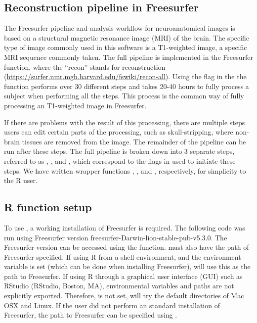 \subsection{Reconstruction pipeline in
Freesurfer}\label{reconstruction-pipeline-in-freesurfer}

The Freesurfer pipeline and analysis workflow for neuroanatomical images
is based on a structural magnetic resonance image (MRI) of the brain.
The specific type of image commonly used in this software is a
T1-weighted image, a specific MRI sequence commonly taken. The full
pipeline is implemented in the Freesurfer  function,
where the ``recon'' stands for reconstruction
(\url{https://surfer.nmr.mgh.harvard.edu/fswiki/recon-all}). Using the
 flag in the the  function performs over 30
different steps and takes 20-40 hours to fully process a subject when
performing all the steps. This process is the common way of fully
processing an T1-weighted image in Freesurfer.

If there are problems with the result of this processing, there are
multiple steps users can edit certain parts of the processing, such as
skull-stripping, where non-brain tissues are removed from the image. The
remainder of the pipeline can be run after these steps. The full
pipeline is broken down into 3 separate steps, referred to as
, , and , which
correspond to the flags in  used to initiate these
steps. We have written wrapper functions ,
, and , respectively, for simplicity
to the R user.

\subsection{R function setup}\label{r-function-setup}

To use , a working installation of Freesurfer is
required. The following code was run using Freesurfer version
freesurfer-Darwin-lion-stable-pub-v5.3.0. The Freesurfer version can be
accessed using the  function.  must
also have the path of Freesurfer specified. If using R from a shell
environment, and the  environment variable is set
(which can be done when installing Freesurfer),  will
use this as the path to Freesurfer. If using R through a graphical user
interface (GUI) such as RStudio (RStudio, Boston, MA), environmental
variables and paths are not explicitly exported. Therefore,
 is not set,  will try the
default directories of Mac OSX and Linux. If the user did not perform an
standard installation of Freesurfer, the path to Freesurfer can be
specified using .

